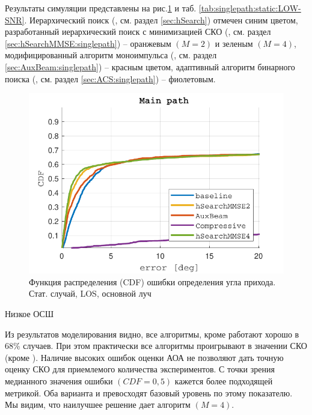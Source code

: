 Результаты симуляции представлены на рис.\ref{fig:singlepath:static:LOW-SNR} и
таб.  \ref{tab:singlepath:static:LOW-SNR}.  Иерархический поиск (\baseline, см.
раздел \ref{sec:hSearch}) отмечен синим цветом, разработанный иерархический
поиск с минимизацией СКО (\hSearchMMSE, см. раздел
\ref{sec:hSearchMMSE:singlepath}) -- оранжевым $(M=2)$ и зеленым $(M=4)$,
модифицированный алгоритм моноимпульса (\AuxBeam, см. раздел
\ref{sec:AuxBeam:singlepath}) -- красным цветом, адаптивный алгоритм бинарного
поиска (\ACS, см. раздел \ref{sec:ACS:singlepath}) -- фиолетовым.
\begin{figure}[ht]
  \centering
  \includegraphics{results/rus/singlepath-static-LOW-SNR-1}
  \caption{Функция распределения (CDF) ошибки определения угла прихода. Стат. случай, LOS, основной луч}
  \label{fig:singlepath:static:LOW-SNR}
\end{figure}

\begin{table}[h!]
  \begin{center}
    \caption{Низкое ОСШ}
    \small
    \label{tab:singlepath:static:LOW-SNR}
  \end{center}
\end{table}


Из результатов моделирования видно, все алгоритмы, кроме \ACS работают хорошо в
68\% случаев. При этом практически все алгоритмы проигрывают \baseline в
значении СКО (кроме \AuxBeam). Наличие высоких ошибок оценки
АОА не позволяют дать точную оценку СКО для приемлемого количества
экспериментов. С точки зрения медианного значения ошибки $(CDF = 0,5)$
кажется более подходящей метрикой. Оба варианта \hSearchMMSE и \AuxBeam
превосходят базовый уровень по этому показателю.  Мы видим, что наилучшее
решение дает алгоритм \hSearchMMSE $(M = 4)$.  

